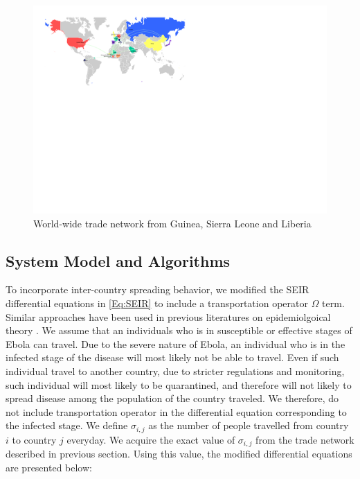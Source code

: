 \documentclass[10pt, journal,onecolumn]{IEEEtran}
\begin{document}
\begin{figure}[ht]
\centering
\includegraphics[scale=1.1]{world1.pdf}
\caption{World-wide trade network from Guinea, Sierra Leone and Liberia}
\label{Fig:worldtrade}
\end{figure}


\subsection{{System Model and Algorithms}}
\label{SubSec:WorldSystem}

To incorporate inter-country spreading behavior, we modified the SEIR differential equations in
\eqref{Eq:SEIR} to include a transportation operator $\Omega$ term. Similar approaches have been
used in previous literatures on epidemiolgoical theory \citep{grais2003assessing,
balcan2010modeling}. We assume that an individuals who is in susceptible or effective stages of
Ebola can travel. Due to the severe nature of Ebola, an individual who is in the infected stage of
the disease will most likely not be able to travel. Even if such individual travel to another
country, due to stricter regulations and monitoring, such individual will most likely to be
quarantined, and therefore will not likely to spread disease among the population of the country
traveled. We therefore, do not  include transportation operator in the differential equation
corresponding to the infected stage. We define $\sigma_{i,j}$ as the number of people travelled from
country $i$ to country $j$ everyday. We acquire the exact value of  $\sigma_{i,j}$ from the trade
network described in previous section.  Using this value, the modified differential equations are
presented below:
\end{document}
